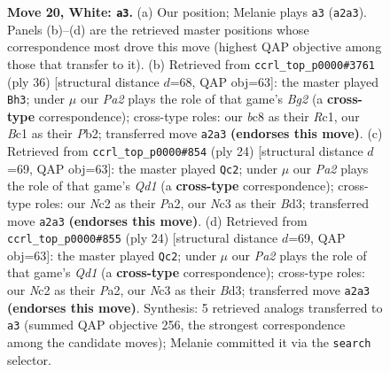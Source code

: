 \documentclass[11pt]{article}
\begin{document}
\begin{figure}[p]
\caption{\textbf{Move 20, White: \texttt{a3}.} (a) Our position; Melanie plays \texttt{a3} (\texttt{a2a3}). Panels (b)--(d) are the retrieved master positions whose correspondence most drove this move (highest QAP objective among those that transfer to it). (b) Retrieved from \texttt{ccrl\_top\_p0000\#3761} (ply 36) [structural distance $d$=68, QAP obj=63]: the master played \texttt{Bh3}; under $\mu$ our \emph{Pa2} plays the role of that game's \emph{Bg2} (a \textbf{cross-type} correspondence); cross-type roles: our \emph{b}c8 as their \emph{R}c1, our \emph{B}c1 as their \emph{P}b2; transferred move \texttt{a2a3} \textbf{(endorses this move)}. (c) Retrieved from \texttt{ccrl\_top\_p0000\#854} (ply 24) [structural distance $d$=69, QAP obj=63]: the master played \texttt{Qc2}; under $\mu$ our \emph{Pa2} plays the role of that game's \emph{Qd1} (a \textbf{cross-type} correspondence); cross-type roles: our \emph{N}c2 as their \emph{P}a2, our \emph{N}c3 as their \emph{B}d3; transferred move \texttt{a2a3} \textbf{(endorses this move)}. (d) Retrieved from \texttt{ccrl\_top\_p0000\#855} (ply 24) [structural distance $d$=69, QAP obj=63]: the master played \texttt{Qc2}; under $\mu$ our \emph{Pa2} plays the role of that game's \emph{Qd1} (a \textbf{cross-type} correspondence); cross-type roles: our \emph{N}c2 as their \emph{P}a2, our \emph{N}c3 as their \emph{B}d3; transferred move \texttt{a2a3} \textbf{(endorses this move)}. Synthesis: 5 retrieved analogs transferred to \texttt{a3} (summed QAP objective 256, the strongest correspondence among the candidate moves); Melanie committed it via the \texttt{search} selector.}
\label{fig:thought-m38}
\end{figure}

\clearpage
\end{document}

